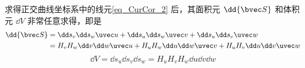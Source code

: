 求得正交曲线坐标系中的线元\autoref{eq_CurCor_2} 后，其面积元 $\dd {\bvec S}$ 和体积元 $\dd V$ 非常任意求得，即是
\begin{equation}\label{eq_CurCor_4}
\begin{aligned}
\dd {\bvec S}&=\dd s_v\dd s _w \uvec u+\dd s_u\dd s _w \uvec v+\dd s_u\dd s _v \uvec w\\
&=H_vH_w\dd v\dd w\uvec u+H_uH_w\dd u\dd w\uvec v+H_uH_v\dd u\dd v\uvec w
\end{aligned}
\end{equation}
\begin{equation}
\dd V=\dd s_u\dd s_v\dd s_w=H_uH_vH_w\dd u\dd v\dd w
\end{equation}
